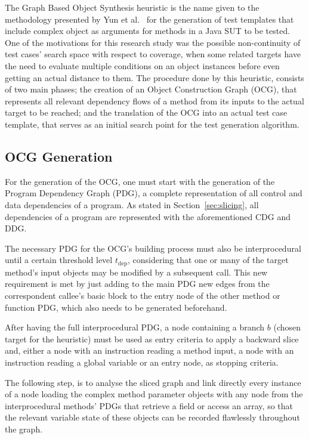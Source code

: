 \documentclass[%
  chapterprefix=false,%
  open=right,%
  twoside=true,%
  paper=a4,%
  logofile={Figures/logo.png},%
  thesistype=master,%
  UKenglish,%
]{se2thesis}
\begin{document}
The Graph Based Object Synthesis heuristic is the name given to the methodology presented by Yun et al.~\cite{DBLP:conf/sigsoft/0001O00D21} for the generation of test templates that include complex object as arguments for methods in a Java SUT to be tested.
One of the motivations for this research study was the possible non-continuity of test cases' search space with respect to coverage, when some related targets have the need to evaluate multiple conditions on an object instances before even getting an actual distance to them.
The procedure done by this heuristic, consists of two main phases; the creation of an Object Construction Graph (OCG), that represents all relevant dependency flows of a method from its inputs to the actual target to be reached; and the translation of the OCG into an actual test case template, that serves as an initial search point for the test generation algorithm.

\subsection{OCG Generation}\label{subsec:ocg_gen}

For the generation of the OCG, one must start with the generation of the Program Dependency Graph (PDG), a complete representation of all control and data dependencies of a program.
As stated in Section~\ref{sec:slicing}, all dependencies of a program are represented with the aforementioned CDG and DDG.\@

The necessary PDG for the OCG's building process must also be interprocedural until a certain threshold level \(t_{\text{dep}}\), considering that one or many of the target method's input objects may be modified by a subsequent call.
This new requirement is met by just adding to the main PDG new edges from the correspondent callee's basic block to the entry node of the other method or function PDG, which also needs to be generated beforehand.

After having the full interprocedural PDG, a node containing a branch \(b\) (chosen target for the heuristic) must be used as entry criteria to apply a backward slice and, either a node with an instruction reading a method input, a node with an instruction reading a global variable or an entry node, as stopping criteria.

The following step, is to analyse the sliced graph and link directly every instance of a node loading the complex method parameter objects with any node from the interprocedural methods' PDGs that retrieve a field or access an array, so that the relevant variable state of these objects can be recorded flawlessly throughout the graph.
\end{document}
